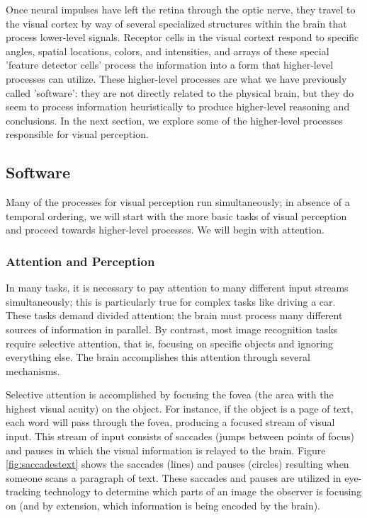 \documentclass[11pt]{isuthesis}
\begin{document}
Once neural impulses have left the retina through the optic nerve, they travel to the visual cortex by way of several specialized structures within the brain that process lower-level signals. Receptor cells in the visual cortext respond to specific angles, spatial locations, colors, and intensities, and arrays of these special 'feature detector cells' process the information into a form that higher-level processes can utilize. These higher-level processes are what we have previously called 'software': they are not directly related to the physical brain, but they do seem to process information heuristically to produce higher-level reasoning and conclusions. In the next section, we explore some of the higher-level processes responsible for visual perception.

\subsection{Software}
Many of the processes for visual perception run simultaneously; in absence of a temporal ordering, we will start with the more basic tasks of visual perception and proceed towards higher-level processes. We will begin with attention.

\subsubsection{Attention and Perception} \label{AttentionPerception}
In many tasks, it is necessary to pay attention to many different input streams simultaneously; this is particularly true for complex tasks like driving a car. These tasks demand divided attention; the brain must process many different sources of information in parallel. By contrast, most image recognition tasks require selective attention, that is, focusing on specific objects and ignoring everything else. The brain accomplishes this attention through several mechanisms. 

Selective attention is accomplished by focusing the fovea (the area with the highest visual acuity) on the object. For instance, if the object is a page of text, each word will pass through the fovea, producing a focused stream of visual input. This stream of input consists of saccades (jumps between points of focus) and pauses in which the visual information is relayed to the brain. Figure \ref{fig:saccadestext} shows the saccades (lines) and pauses (circles) resulting when someone scans a paragraph of text. These saccades and pauses are utilized in eye-tracking technology to determine which parts of an image the observer is focusing on (and by extension, which information is being encoded by the brain). 
\end{document}
